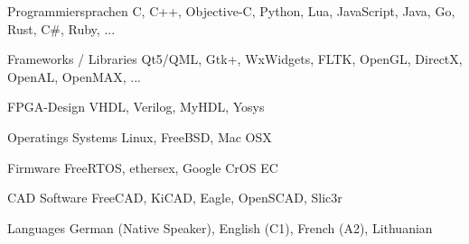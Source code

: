 
\begin{cvskills}

  \cvskill
    {Programmiersprachen} %
    {C, C++, Objective-C, Python, Lua, JavaScript, Java, Go, Rust, C\#, Ruby, ...} %
    
  \cvskill
    {Frameworks / Libraries} %
    {Qt5/QML, Gtk+, WxWidgets, FLTK, OpenGL, DirectX, OpenAL, OpenMAX, ...} %

  \cvskill
    {FPGA-Design} %
    {VHDL, Verilog, MyHDL, Yosys} %
    
  \cvskill
    {Operatings Systems} %
    {Linux, FreeBSD, Mac OSX} %

  \cvskill
    {Firmware}
    {FreeRTOS, ethersex, Google CrOS EC}
    
  \cvskill
    {CAD Software} %
    {FreeCAD, KiCAD, Eagle, OpenSCAD, Slic3r} %

  \cvskill
    {Languages} %
    {German (Native Speaker), English (C1), French (A2), Lithuanian} %

\end{cvskills}
